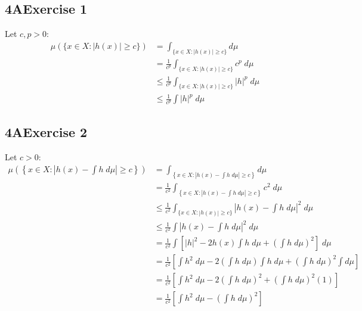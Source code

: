 \documentclass[12pt, letterpaper]{article}
\begin{document}
\subsection*{4\hspace{1pt}A\hspace{20pt}Exercise 1} Let $c, p>0$:
\begin{align*}
    \mu(\{x\in X: |h(x)|\geq c\})&=\int_{\{x\in X: |h(x)|\geq c\}} d\mu\\
    &=\frac{1}{c^p}\int_{\{x\in X: |h(x)|\geq c\}} c^p\;d\mu\\
    &\leq\frac{1}{c^p}\int_{\{x\in X: |h(x)|\geq c\}} |h|^p\;d\mu\\
    &\leq\frac{1}{c^p}\int |h|^p\;d\mu
\end{align*}
\clearpage

\subsection*{4\hspace{1pt}A\hspace{20pt}Exercise 2}
Let $c>0$:
\begin{align*}
    \mu\left(\left\{x\in X: \left|h(x)-\int h\;d\mu\right|\geq c\right\}\right)&=\int_{\left\{x\in X: \left|h(x)-\int h\;d\mu\right|\geq c\right\}} d\mu\\
    &=\frac{1}{c^2}\int_{\left\{x\in X: \left|h(x)-\int h\;d\mu\right|\geq c\right\}} c^2\;d\mu\\
    &\leq\frac{1}{c^2}\int_{\{x\in X: |h(x)|\geq c\}} \left|h(x)-\int h\;d\mu\right|^2\;d\mu\\
    &\leq\frac{1}{c^2}\int \left|h(x)-\int h\;d\mu\right|^2\;d\mu\\
    &=\frac{1}{c^2}\int \left[|h|^2-2h(x)\int h\;d\mu+\left(\int h\;d\mu\right)^2\right] \;d\mu\\
    &=\frac{1}{c^2}\left[\int h^2\;d\mu-2(\int h\;d\mu)\int h\;d\mu+\left(\int h\;d\mu\right)^2 \int d\mu\right]\\
    &=\frac{1}{c^2}\left[\int h^2\;d\mu-2\left(\int h\;d\mu\right)^2+\left(\int h\;d\mu\right)^2\left(1\right)\right]\\
    &=\frac{1}{c^2}\left[\int h^2\;d\mu-\left(\int h\;d\mu\right)^2\right]
\end{align*}
\clearpage
\end{document}
